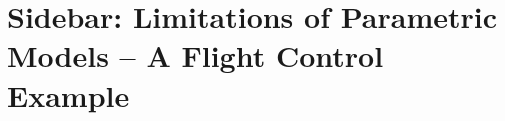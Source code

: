 \section[Limitations of Parametric Models -- A Flight Control Example]{Sidebar: Limitations of Parametric Models -- A Flight Control Example}\label{sb:eg_issue}
	